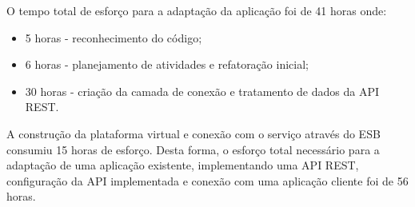 O tempo total de esforço para a adaptação da aplicação foi de 41 horas onde:
\begin{itemize}
\item 5 horas - reconhecimento do código;
\item 6 horas - planejamento de atividades e refatoração inicial;
\item 30 horas - criação da camada de conexão e tratamento de dados da API REST.
\end{itemize}

A construção da plataforma virtual e conexão com o serviço através do ESB consumiu 15 horas de esforço. Desta forma, o esforço total necessário para a adaptação de uma aplicação existente, implementando uma API REST, configuração da API implementada e conexão com uma aplicação cliente foi de 56 horas.
